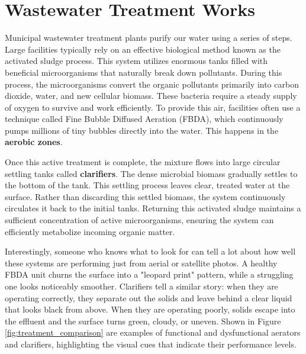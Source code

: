 \label{chap:background}

\section{Wastewater Treatment Works}
Municipal wastewater treatment plants purify our water using a series of steps. Large facilities typically rely on an effective biological method known as the activated sludge process. This system utilizes enormous tanks filled with beneficial microorganisms that naturally break down pollutants. During this process, the microorganisms convert the organic pollutants primarily into carbon dioxide, water, and new cellular biomass. These bacteria require a steady supply of oxygen to survive and work efficiently. To provide this air, facilities often use a technique called Fine Bubble Diffused Aeration (FBDA), which continuously pumps millions of tiny bubbles directly into the water. This happens in the \textbf{aerobic zones}. 

Once this active treatment is complete, the mixture flows into large circular settling tanks called \textbf{clarifiers}. The dense microbial biomass gradually settles to the bottom of the tank. This settling process leaves clear, treated water at the surface. Rather than discarding this settled biomass, the system continuously circulates it back to the initial tanks. Returning this activated sludge maintains a sufficient concentration of active microorganisms, ensuring the system can efficiently metabolize incoming organic matter.

Interestingly, someone who knows what to look for can tell a lot about how well these systems are performing just from aerial or satellite photos. A healthy FBDA unit churns the surface into a "leopard print" pattern, while a struggling one looks noticeably smoother. Clarifiers tell a similar story: when they are operating correctly, they separate out the solids and leave behind a clear liquid that looks black from above. When they are operating poorly, solids escape into the effluent and the surface turns green, cloudy, or uneven. Shown in Figure \ref{fig:treatment_comparison} are examples of functional and dysfunctional aerators and clarifiers, highlighting the visual cues that indicate their performance levels.

